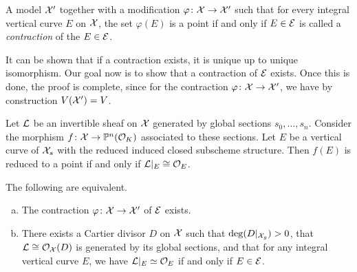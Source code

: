 \begin{definition}
    A model $\mathcal X'$ together with a modification $\varphi \colon \mathcal X \to \mathcal X'$ such that for every integral vertical curve $E$ on $\mathcal X$,
    the set $\varphi(E)$ is a point if and only if $E \in \mathcal{E}$ is called a \textit{contraction} of the $E \in \mathcal{E}$.
\end{definition}

It can be shown that if a contraction exists, it is unique up to unique isomorphism.
Our goal now is to show that a contraction of $\mathcal{E}$ exists.
Once this is done, the proof is complete, since for the contraction $\varphi \colon \mathcal X \to \mathcal X'$, we have by construction $V(\mathcal X') = V$.

\begin{lemma} \label{lem:criterion_point}
    Let $\mathcal{L}$ be an invertible sheaf on $\mathcal X$ generated by global sections $s_0, \dots, s_n$.
    Consider the morphism $f \colon \mathcal X \to \mathbb P^n(\mathcal O_K )$ associated to these sections.
    Let $E$ be a vertical curve of $\mathcal X_s$ with the reduced induced closed subscheme structure.
    Then $f(E)$ is reduced to a point if and only if $\mathcal{L}|_E \cong \mathcal{O}_E$.
\end{lemma}

\begin{proposition} \label{prop:exist_contr}
    The following are equivalent.
    \begin{enumerate}[(a)]
    \item The contraction $\varphi \colon \mathcal X \to \mathcal X'$ of $\mathcal{E}$ exists. \label{prop:exist_contr_i}
    \item There exists a Cartier divisor $D$ on $\mathcal X$ such that $\deg(D|_{\mathcal X_g}) > 0$, that $\mathcal{L} \cong \mathcal{O}_\mathcal X(D)$ is generated
    by its global sections, and that for any integral vertical curve $E$, we have $\mathcal{L}|_E \simeq \mathcal{O}_E$ if and only if $E \in \mathcal{E}$. \label{prop:exist_contr_ii}
    \end{enumerate}
\end{proposition}

